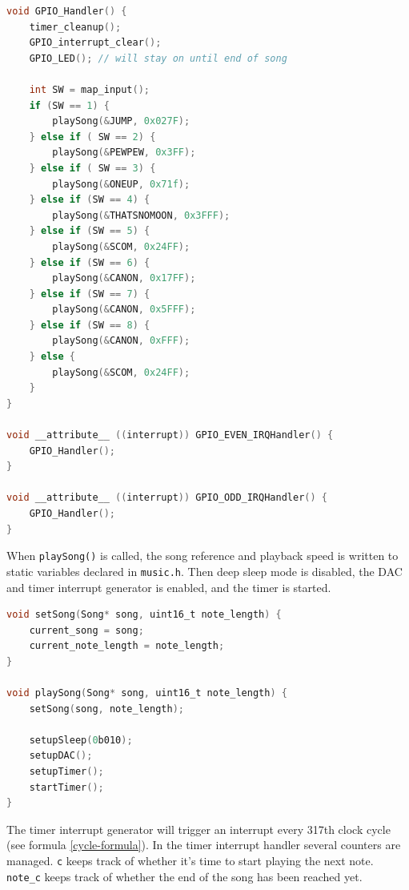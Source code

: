 \begin{minipage}{\linewidth}
\begin{lstlisting}[language=C, label=interrupt_handlers, caption=GPIO handling from interrupt\_handlers.c]
void GPIO_Handler() {
    timer_cleanup();
    GPIO_interrupt_clear();
    GPIO_LED(); // will stay on until end of song

    int SW = map_input();
    if (SW == 1) {
        playSong(&JUMP, 0x027F);
    } else if ( SW == 2) {
        playSong(&PEWPEW, 0x3FF);
    } else if ( SW == 3) {
        playSong(&ONEUP, 0x71f);
    } else if (SW == 4) {
        playSong(&THATSNOMOON, 0x3FFF);
    } else if (SW == 5) {
        playSong(&SCOM, 0x24FF);
    } else if (SW == 6) {
        playSong(&CANON, 0x17FF);
    } else if (SW == 7) {
        playSong(&CANON, 0x5FFF);
    } else if (SW == 8) {
        playSong(&CANON, 0xFFF);
    } else {
        playSong(&SCOM, 0x24FF);
    }
}

void __attribute__ ((interrupt)) GPIO_EVEN_IRQHandler() { 
    GPIO_Handler();
}

void __attribute__ ((interrupt)) GPIO_ODD_IRQHandler() {
    GPIO_Handler();
}
\end{lstlisting}
\end{minipage}

When \texttt{playSong()} is called, the song reference and playback speed is written to static variables declared in \texttt{music.h}. Then deep sleep mode is disabled, the DAC and timer interrupt generator is enabled, and the timer is started.

\begin{minipage}{\linewidth}
\begin{lstlisting}[language=C, label=playing_music, caption=Excerpts from music.c]
void setSong(Song* song, uint16_t note_length) {
    current_song = song;
    current_note_length = note_length;
}

void playSong(Song* song, uint16_t note_length) {
    setSong(song, note_length);

    setupSleep(0b010);
    setupDAC();
    setupTimer();
    startTimer();
}
\end{lstlisting}
\end{minipage}

The timer interrupt generator will trigger an interrupt every 317th clock cycle (see formula \ref{cycle-formula}). In the timer interrupt handler several counters are managed. \texttt{c} keeps track of whether it's time to start playing the next note. \texttt{note\_c} keeps track of whether the end of the song has been reached yet.

